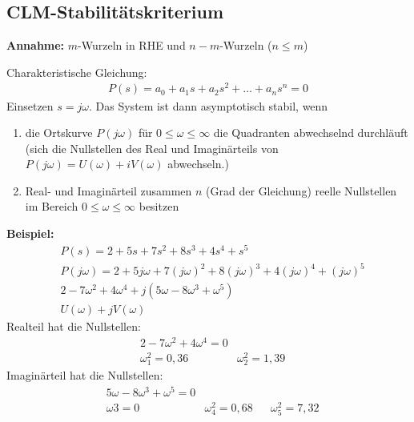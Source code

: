 \subsection{CLM-Stabilitätskriterium}
\begin{tcolorbox}[colback=white!10!white,colframe=green!30!black,title=CLM Kriterium] 
    \textbf{Annahme:}
    $m$-Wurzeln in RHE  und $n-m$-Wurzeln ($n \leq m$)
    
    Charakteristische Gleichung:
    \begin{align*}
        P(s) = a_0 + a_1s + a_2s^2 + \ldots + a_n s^n = 0 
    \end{align*}
    Einsetzen $s = j\omega$. 
    Das System ist dann asymptotisch stabil, wenn
    \begin{enumerate}
        \item die Ortskurve $P(j\omega)$  für $0 \leq \omega \leq \infty$ die Quadranten abwechselnd durchläuft (sich die Nullstellen des Real und Imaginärteils von $P(j\omega) = U(\omega)+iV(\omega)$ abwechseln.) 
        \item Real- und Imaginärteil zusammen $n$ (Grad der Gleichung) reelle Nullstellen im Bereich $0 \leq \omega \leq \infty$ besitzen 
    \end{enumerate} 
    
    
    
    
    \tcblower
    
    \textbf{Beispiel:}
    \begin{align*}
        &P(s) = 2 + 5s +7s^2 +8s^3 +4s^4 +s^5\\
        &P(j\omega) = 2 + 5j\omega + 7(j\omega)^2 +8 (j\omega)^3 + 4 (j\omega)^4 + (j\omega)^5\\
        &2-7\omega^2 +4\omega^4 + j (5\omega - 8\omega^3 +\omega^5)\\
        &U(\omega) + jV(\omega)
    \end{align*}
    Realteil hat die Nullstellen:
    \begin{align*}
        &2-7\omega^2 +4\omega^4 = 0 \\
        &\omega_1^2 = 0,36 & \omega_2^2= 1,39
    \end{align*}
        Imaginärteil hat die Nullstellen:
        \begin{align*}
        &5\omega - 8\omega^3 +\omega^5= 0 \\
        &\omega3 = 0  & \omega_4^2= 0,68 & & \omega_5^2= 7,32 
        \end{align*}
        

\end{tcolorbox}
